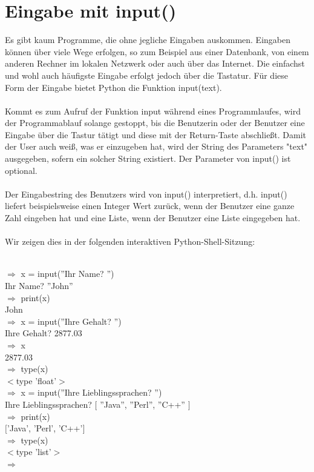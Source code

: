 \section{Eingabe mit input()}
Es gibt kaum Programme, die ohne jegliche Eingaben auskommen. Eingaben können über viele Wege erfolgen, so zum Beispiel aus einer Datenbank, von einem anderen Rechner im lokalen Netzwerk oder auch über das Internet. Die einfachst und wohl auch häufigste Eingabe erfolgt jedoch über die Tastatur. Für diese Form der Eingabe bietet Python die Funktion input(text). \\
\\
Kommt es zum Aufruf der Funktion input während eines Programmlaufes, wird der Programmablauf solange gestoppt, bis die Benutzerin oder der Benutzer eine Eingabe über die Tastur tätigt und diese mit der Return-Taste abschließt. Damit der User auch weiß, was er einzugeben hat, wird der String des Parameters "text" ausgegeben, sofern ein solcher String existiert. Der Parameter von input() ist optional. \\
\\
Der Eingabestring des Benutzers wird von input() interpretiert, d.h. input() liefert beispielsweise einen Integer Wert zurück, wenn der Benutzer eine ganze Zahl eingeben hat und eine Liste, wenn der Benutzer eine Liste eingegeben hat. \\
\\
Wir zeigen dies in der folgenden interaktiven Python-Shell-Sitzung: \\
\\
\begin{MyConsoleBox}{
${\Longrightarrow}$ x = input(''Ihr Name? '') \\
Ihr Name? ''John'' \\
${\Longrightarrow}$ print(x) \\
John \\
${\Longrightarrow}$ x = input(''Ihre Gehalt? '') \\
Ihre Gehalt? 2877.03 \\
${\Longrightarrow}$ x \\
2877.03 \\
${\Longrightarrow}$ type(x) \\
$<$type 'float'$>$  \\
${\Longrightarrow}$ x = input(''Ihre Lieblingssprachen? '') \\
Ihre Lieblingssprachen? $[$ ''Java'', ''Perl'', ''C++'' $]$ \\
${\Longrightarrow}$ print(x) \\
$[$'Java', 'Perl', 'C++'$]$ \\
${\Longrightarrow}$ type(x) \\
$<$type 'list'$>$ \\
${\Longrightarrow}$ \\
}\end{MyConsoleBox}
\\
